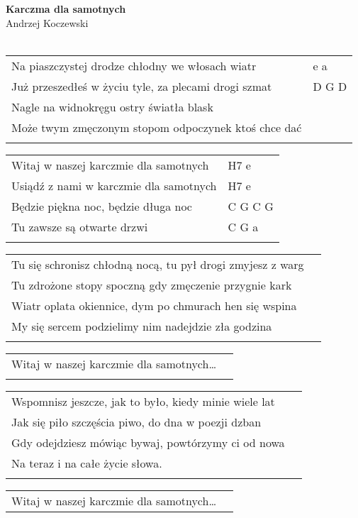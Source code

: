 \documentclass[a5paper]{article}
\begin{document}


\noindent
\fontsize{12pt}{15pt}\selectfont
\textbf{Karczma dla samotnych} \\
\fontsize{8pt}{10pt}\selectfont
Andrzej Koczewski \\ \\
\fontsize{10pt}{12pt}\selectfont
{}
\begin{tabular}{@{}p{9.00cm}p{3cm}@{}}
\noindent
Na piaszczystej drodze chłodny we włosach wiatr & e a \\
Już przeszedłeś w życiu tyle, za plecami drogi szmat & D G D\\
Nagle na widnokręgu ostry światła blask \\
Może twym zmęczonym stopom odpoczynek ktoś chce dać \\ \\
\end{tabular}

\noindent
\begin{tabular}{@{}p{8.00cm}p{3cm}@{}}
Witaj w naszej karczmie dla samotnych & H7 e \\
Usiądź z nami w karczmie dla samotnych & H7 e \\
Będzie piękna noc, będzie długa noc & C G C G \\
Tu zawsze są otwarte drzwi & C G a \\ \\
\end{tabular}

\noindent
\begin{tabular}{@{}p{10.00cm}p{3cm}@{}}
Tu się schronisz chłodną nocą, tu pył drogi zmyjesz z warg \\
Tu zdrożone stopy spoczną gdy zmęczenie przygnie kark\\
Wiatr oplata okiennice, dym po chmurach hen się wspina\\
My się sercem podzielimy nim nadejdzie zła godzina\\\\
\end{tabular}

\noindent
\begin{tabular}{@{}p{8.00cm}p{3cm}@{}}
Witaj w naszej karczmie dla samotnych… \\ \\
\end{tabular}

\noindent
\begin{tabular}{@{}p{10.00cm}p{3cm}@{}}
Wspomnisz jeszcze, jak to było, kiedy minie wiele lat\\
Jak się piło szczęścia piwo, do dna w poezji dzban\\
Gdy odejdziesz mówiąc bywaj, powtórzymy ci od nowa\\
Na teraz i na całe życie słowa.\\\\
\end{tabular}
%
\noindent
\begin{tabular}{@{}p{8.00cm}p{3cm}@{}}
Witaj w naszej karczmie dla samotnych…
\end{tabular}
\end{document}
